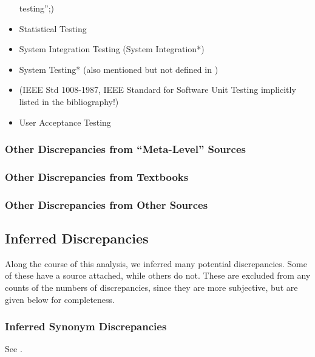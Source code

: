 \begin{itemize}
                  testing'';)
            \item Statistical Testing
            \item System Integration Testing (System Integration*)
            \item System Testing* (also mentioned but not defined in \citep{IEEE2013})
            \item {}
                  (IEEE Std 1008-1987, IEEE Standard for
                  Software Unit Testing implicitly listed in the bibliography!)
            \item User Acceptance Testing
      \end{itemize}
\fi

\subsubsection{Other Discrepancies from ``Meta-Level'' Sources}


\ifnotpaper\subsubsection{Other Discrepancies from Textbooks}
      \fi

\subsubsection{Other Discrepancies from Other Sources}


\ifnotpaper
      \subsection{Inferred Discrepancies}
      Along the course of this analysis, we inferred many potential discrepancies.
      Some of these have a source attached, while others do not. These are excluded
      from any counts of the numbers of discrepancies, since they are more
      subjective, but are given below for completeness.

      \subsubsection{Inferred Synonym Discrepancies}
      See .

      \begin{enumerate}
            
      \end{enumerate}


